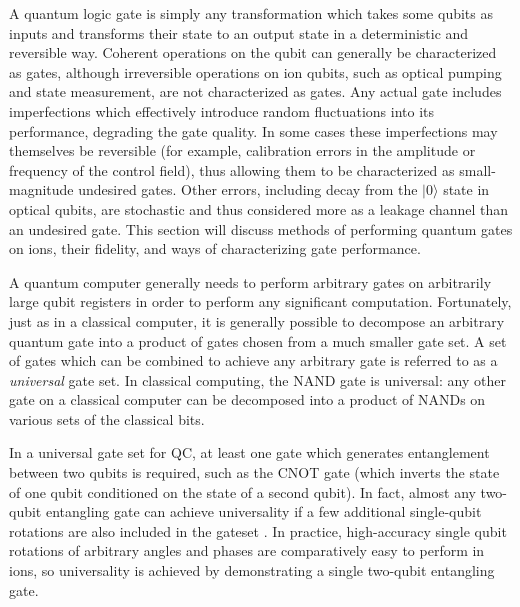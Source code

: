 \documentclass[%
reprint,
 amsmath,amssymb,
]{revtex4-1}
\newcommand{\zero}{|0 \rangle}
\begin{document}
A quantum logic gate is simply any transformation which takes some qubits as inputs and transforms their state to an output state in a deterministic and reversible way. Coherent operations on the qubit can generally be characterized as gates, although irreversible operations on ion qubits, such as optical pumping and state measurement, are not characterized as gates. Any actual gate includes imperfections which effectively introduce random fluctuations into its performance, degrading the gate quality. In some cases these imperfections may themselves be reversible (for example, calibration errors in the amplitude or frequency of the control field), thus allowing them to be characterized as small-magnitude undesired gates. Other errors, including decay from the $\zero$ state in optical qubits, are stochastic and thus considered more as a leakage channel than an undesired gate. This section will discuss methods of performing quantum gates on ions, their fidelity, and ways of characterizing gate performance.

A quantum computer generally needs to perform arbitrary gates on arbitrarily large qubit registers in order to perform any significant computation. Fortunately, just as in a classical computer, it is generally possible to decompose an arbitrary quantum gate into a product of gates chosen from a much smaller gate set. A set of gates which can be combined to achieve any arbitrary gate is referred to as a \emph{universal} gate set. In classical computing, the NAND gate is universal: any other gate on a classical computer can be decomposed into a product of NANDs on various sets of the classical bits.

In a universal gate set for QC, at least one gate which generates entanglement between two qubits is required, such as the CNOT gate (which inverts the state of one qubit conditioned on the state of a second qubit). In fact, almost any two-qubit entangling gate can achieve universality if a few additional single-qubit rotations are also included in the gateset \cite{LloydAlmostAny1995, DiVincenzoUniversal2Qgate1995}. In practice, high-accuracy single qubit rotations of arbitrary angles and phases are comparatively easy to perform in ions, so universality is achieved by demonstrating a single two-qubit entangling gate.

\end{document}
